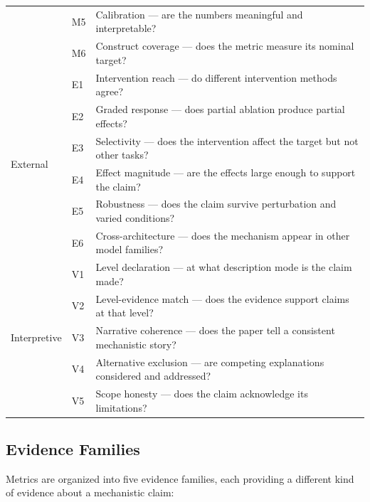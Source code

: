 \documentclass[10pt]{article}
\begin{document}
\begin{table}[t]
\begin{tabular}{@{}llp{7.5cm}@{}}
& M5 & Calibration --- are the numbers meaningful and interpretable? \\
& M6 & Construct coverage --- does the metric measure its nominal target? \\
\midrule
\multirow{6}{*}{External} & E1 & Intervention reach --- do different intervention methods agree? \\
& E2 & Graded response --- does partial ablation produce partial effects? \\
& E3 & Selectivity --- does the intervention affect the target but not other tasks? \\
& E4 & Effect magnitude --- are the effects large enough to support the claim? \\
& E5 & Robustness --- does the claim survive perturbation and varied conditions? \\
& E6 & Cross-architecture --- does the mechanism appear in other model families? \\
\midrule
\multirow{5}{*}{Interpretive} & V1 & Level declaration --- at what description mode is the claim made? \\
& V2 & Level-evidence match --- does the evidence support claims at that level? \\
& V3 & Narrative coherence --- does the paper tell a consistent mechanistic story? \\
& V4 & Alternative exclusion --- are competing explanations considered and addressed? \\
& V5 & Scope honesty --- does the claim acknowledge its limitations? \\
\bottomrule
\end{tabular}
\end{table}

\subsection{Evidence Families}
\label{sec:evidence-families}

Metrics are organized into five evidence families, each providing a different kind of evidence about a mechanistic claim:
\end{document}
